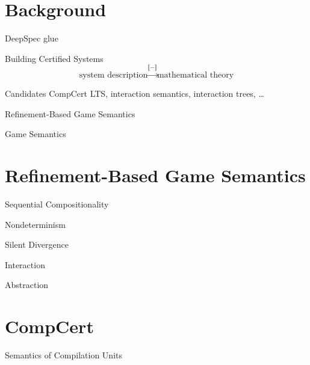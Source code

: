 \documentclass{beamer}
\begin{document}
\section{Background}

\begin{frame}{DeepSpec glue} %
\end{frame}

\begin{frame}{Building Certified Systems} %
\[
    \mbox{system description}
    \xrightarrow{\llbracket - \rrbracket}
    \mbox{mathematical theory}
\]
\end{frame}

\begin{frame}{Candidates} %
CompCert LTS, interaction semantics, interaction trees, \ldots

Refinement-Based Game Semantics
\end{frame}

\begin{frame}{Game Semantics} %
\end{frame}

\section{Refinement-Based Game Semantics}

\begin{frame}{Sequential Compositionality} %
\end{frame}

\begin{frame}{Nondeterminism} %
\end{frame}

\begin{frame}{Silent Divergence} %
\end{frame}

\begin{frame}{Interaction} %
\end{frame}

\begin{frame}{Abstraction} %
\end{frame}

\section{CompCert}

\begin{frame}{Semantics of Compilation Units} %
\end{frame}
\end{document}
